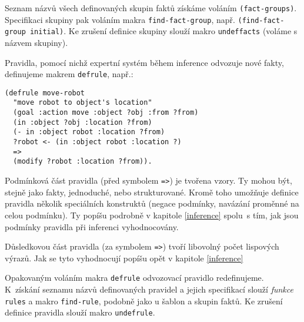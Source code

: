 Seznam názvů všech definovaných skupin faktů získáme voláním
\verb|(fact-groups)|. Specifikaci skupiny pak voláním makra
\verb|find-fact-group|, např. \verb|(find-fact-group initial)|. Ke zrušení
definice skupiny slouží makro \verb|undeffacts| (voláme s názvem skupiny).

Pravidla, pomocí nichž expertní systém během inference odvozuje nové fakty,
definujeme makrem
\verb|defrule|, např.:
\begin{verbatim}
(defrule move-robot
  "move robot to object's location"
  (goal :action move :object ?obj :from ?from)
  (in :object ?obj :location ?from)
  (- in :object robot :location ?from)
  ?robot <- (in :object robot :location ?)
  =>
  (modify ?robot :location ?from)).
\end{verbatim}
Podmínková část pravidla (před symbolem \verb|=>|) je tvořena vzory. Ty mohou
být, stejně jako fakty, jednoduché, nebo strukturované. Kromě toho umožňuje
definice pravidla několik speciálních konstruktů (negace podmínky, navázání
proměnné na celou podmínku). Ty popíšu podrobně v kapitole \ref{inference} spolu~s
tím, jak jsou podmínky pravidla při inferenci vyhodnocovány.

Důsledkovou část pravidla (za symbolem \verb|=>|) tvoří libovolný počet
lispových výrazů. Jak se tyto vyhodnocují popíšu opět v kapitole \ref{inference}

\FloatBarrier

Opakovaným voláním makra \verb|defrule| odvozovací pravidlo redefinujeme.
K~získání seznamu názvů definovaných pravidel a jejich specifikací slouží
\emph{funkce} \verb|rules| a makro \verb|find-rule|, podobně jako u šablon a
skupin faktů.  Ke zrušení definice pravidla slouží makro \verb|undefrule|.
